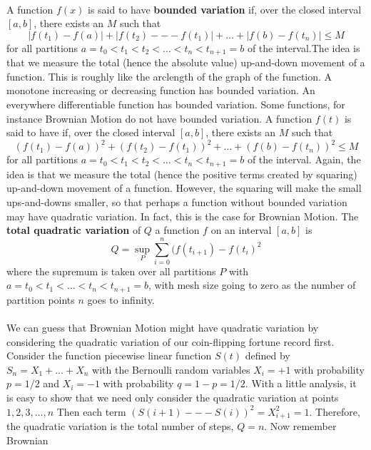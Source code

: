 \begin{solution}
\begin{solution}
\begin{solution}
\begin{solution}
\begin{solution}
\begin{solution}
\begin{solution}
\begin{solution}
\begin{solution}
\begin{solution}
{\begin{problem}
  \\
  A function $f(x)$ is said to have \textbf{bounded variation} if, over the closed 
  interval $[a,b]$, there exists an $M$ such that
  \[
    | f(t_1) - f(a)| + |f(t_2) --- f(t_1)| + \ldots + |f(b) - f(t_n)| \le M
  \]
  \ni  for all partitions $a = t_0 < t_1 < t_2 < \ldots < t_n < t_{n+1} = b$ 
  of the interval.The idea is that we measure the total (hence the absolute value)
  up-and-down movement of a function.  This is roughly like the arclength of the 
  graph of the function.  A monotone increasing or decreasing function has bounded 
  variation.  An everywhere differentiable function has bounded variation.  
  Some functions, for instance Brownian Motion do not have bounded variation. A function 
  $f(t)$ is said to have  if, over the closed interval $[a,b]$, 
  there exists an $M$ such that
  \[
    (f(t_1) - f(a))^2 + (f(t_2) - f(t_1))^2 + \ldots + (f(b) - f(t_n))^2\le M
  \]
  \ni for all partitions $a=t_0<t_1<t_2<\ldots < t_n < t_{n+1} = b$ of the interval.
  Again, the idea is that we measure the total (hence the positive terms
  created by squaring) up-and-down movement of a function.  However, the squaring will 
  make the small ups-and-downs smaller, so that perhaps a function without
  bounded variation may have quadratic variation.  In fact, this is the
  case for Brownian Motion. The \textbf{total quadratic variation} of $Q$ a function 
  $f$ on an interval $[a,b]$ is
  \[
    Q = \sup_{P} \sum_{i=0}^{n} (f(t_{i+1}) - f(t_{i})^2
  \]
  where the supremum is taken over all partitions $P$ with 
  $ a = t_0 < t _1 < \ldots < t_n < t_{n+1} = b$, with mesh size
  going to zero as the number of partition points $n$ goes to infinity. \\
  \ni{} \\
  \ni We can guess that Brownian Motion might have quadratic variation by
  considering the quadratic variation of our coin-flipping fortune record
  first.  Consider the function piecewise linear function $S(t)$ 
  defined by $S_n = X_1 + \ldots + X_n$ with the Bernoulli random variables 
  $X_i = +1$ with probability $p = 1/2$ and $X_i = -1$ with probability 
  $q = 1-p = 1/2$. With a little analysis, it is easy to show that we need
  only consider the quadratic variation at points $1,2,3, \ldots, n$
  Then each term $(S(i+1) --- S(i))^2 = X_{i+1}^2 = 1$.  Therefore, the
  quadratic variation is the total number of steps, $Q=n$. Now remember Brownian 

\end{problem}}
\end{solution}
\end{solution}
\end{solution}
\end{solution}
\end{solution}
\end{solution}
\end{solution}
\end{solution}
\end{solution}
\end{solution}
